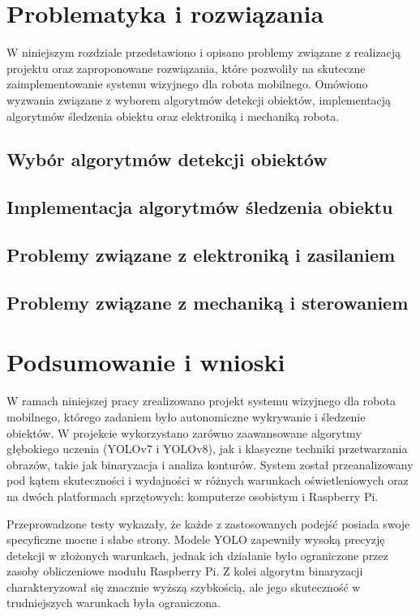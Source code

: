 \documentclass[a4paper,twoside,12pt]{book}
\begin{document}
\chapter{Problematyka i rozwiązania}
\label{ch:06}
W niniejszym rozdziale przedstawiono i opisano problemy związane z realizacją projektu oraz zaproponowane rozwiązania, które pozwoliły na skuteczne zaimplementowanie systemu wizyjnego dla robota mobilnego. Omówiono wyzwania związane z wyborem algorytmów detekcji obiektów, implementacją algorytmów śledzenia obiektu oraz elektroniką i mechaniką robota.

\section{Wybór algorytmów detekcji obiektów}

\section{Implementacja algorytmów śledzenia obiektu}
\section{Problemy związane z elektroniką i zasilaniem}
\section{Problemy związane z mechaniką i sterowaniem}

\chapter{Podsumowanie i wnioski}
\label{ch:07}

W ramach niniejszej pracy zrealizowano projekt systemu wizyjnego dla robota mobilnego, którego zadaniem było autonomiczne wykrywanie i śledzenie obiektów. W projekcie wykorzystano zarówno zaawansowane algorytmy głębokiego uczenia (YOLOv7 i YOLOv8), jak i klasyczne techniki przetwarzania obrazów, takie jak binaryzacja i analiza konturów. System został przeanalizowany pod kątem skuteczności i wydajności w różnych warunkach oświetleniowych oraz na dwóch platformach sprzętowych: komputerze osobistym i Raspberry Pi.

Przeprowadzone testy wykazały, że każde z zastosowanych podejść posiada swoje specyficzne mocne i słabe strony. Modele YOLO zapewniły wysoką precyzję detekcji w złożonych warunkach, jednak ich działanie było ograniczone przez zasoby obliczeniowe modułu Raspberry Pi. Z kolei algorytm binaryzacji charakteryzował się znacznie wyższą szybkością, ale jego skuteczność w trudniejszych warunkach była ograniczona.
\end{document}
